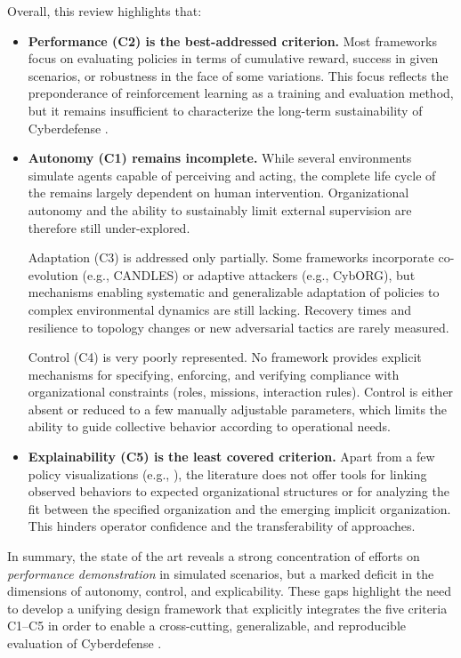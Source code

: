 Overall, this review highlights that:
\begin{itemize}
  \item \textbf{Performance (C2) is the best-addressed criterion.} Most frameworks focus on evaluating policies in terms of cumulative reward, success in given scenarios, or robustness in the face of some variations. This focus reflects the preponderance of reinforcement learning as a training and evaluation method, but it remains insufficient to characterize the long-term sustainability of Cyberdefense .

  \item \textbf{Autonomy (C1) remains incomplete.} While several environments simulate agents capable of perceiving and acting, the complete life cycle of the  remains largely dependent on human intervention. Organizational autonomy and the ability to sustainably limit external supervision are therefore still under-explored.

        Adaptation (C3) is addressed only partially. Some frameworks incorporate co-evolution (e.g., CANDLES) or adaptive attackers (e.g., CybORG), but mechanisms enabling systematic and generalizable adaptation of policies to complex environmental dynamics are still lacking. Recovery times and resilience to topology changes or new adversarial tactics are rarely measured.

        Control (C4) is very poorly represented. No framework provides explicit mechanisms for specifying, enforcing, and verifying compliance with organizational constraints (roles, missions, interaction rules). Control is either absent or reduced to a few manually adjustable parameters, which limits the ability to guide collective behavior according to operational needs.

  \item \textbf{Explainability (C5) is the least covered criterion.} Apart from a few policy visualizations (e.g., ), the literature does not offer tools for linking observed behaviors to expected organizational structures or for analyzing the fit between the specified organization and the emerging implicit organization. This hinders operator confidence and the transferability of approaches.
\end{itemize}

\noindent
In summary, the state of the art reveals a strong concentration of efforts on \emph{performance demonstration} in simulated scenarios, but a marked deficit in the dimensions of autonomy, control, and explicability. These gaps highlight the need to develop a unifying design framework that explicitly integrates the five criteria C1--C5 in order to enable a cross-cutting, generalizable, and reproducible evaluation of Cyberdefense .



